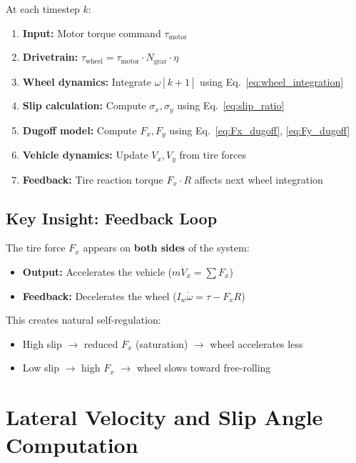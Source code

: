 \documentclass[11pt,a4paper]{article}
\begin{document}
At each timestep $k$:

\begin{enumerate}
    \item \textbf{Input:} Motor torque command $\tau_{\text{motor}}$
    \item \textbf{Drivetrain:} $\tau_{\text{wheel}} = \tau_{\text{motor}} \cdot N_{\text{gear}} \cdot \eta$
    \item \textbf{Wheel dynamics:} Integrate $\omega[k+1]$ using Eq.~\ref{eq:wheel_integration}
    \item \textbf{Slip calculation:} Compute $\sigma_x, \sigma_y$ using Eq.~\ref{eq:slip_ratio}
    \item \textbf{Dugoff model:} Compute $F_x, F_y$ using Eq.~\ref{eq:Fx_dugoff}, \ref{eq:Fy_dugoff}
    \item \textbf{Vehicle dynamics:} Update $V_x, V_y$ from tire forces
    \item \textbf{Feedback:} Tire reaction torque $F_x \cdot R$ affects next wheel integration
\end{enumerate}

\subsection{Key Insight: Feedback Loop}

The tire force $F_x$ appears on \textbf{both sides} of the system:
\begin{itemize}
    \item \textbf{Output:} Accelerates the vehicle ($m\dot{V}_x = \sum F_x$)
    \item \textbf{Feedback:} Decelerates the wheel ($I_w \dot{\omega} = \tau - F_x R$)
\end{itemize}

This creates natural self-regulation:
\begin{itemize}
    \item High slip $\rightarrow$ reduced $F_x$ (saturation) $\rightarrow$ wheel accelerates less
    \item Low slip $\rightarrow$ high $F_x$ $\rightarrow$ wheel slows toward free-rolling
\end{itemize}

\section{Lateral Velocity and Slip Angle Computation}
\end{document}
